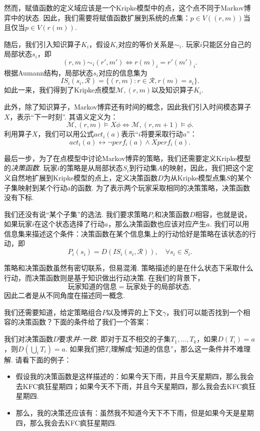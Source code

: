 然而，赋值函数的定义域应该是一个Kripke模型中的点，这个点不同于Markov博弈中的状态. 因此，我们需要将赋值函数扩展到系统的点集：$p \in V((r, m))$当且仅当$p\in V(r(m))$. 

随后，我们引入知识算子$K_i$，假设$K_i$对应的等价关系是$\sim_i$. 玩家$i$只能区分自己的局部状态$s_i$，即
\[(r, m) \sim_i (r', m')\iff r(m)_i = r'(m')_i.\]
根据Aumann结构，局部状态$s_i$对应的信息集为
\[
IS_i(s_i, \mathcal{R}) = \{(r, m): r \in \mathcal{R}, r(m) = s_i\}.
\]
如此一来，我们得到了Kripke点模型$\mathcal{M}, (r, m)$以及知识算子$K_i$.

此外，除了知识算子，Markov博弈还有时间的概念，因此我们引入时间模态算子$X$，表示“下一时刻”. 其语义定义为：
\[
\mathcal{M}, (r, m) \vDash X\phi \iff \mathcal{M}, (r, m+1) \vDash \phi.
\]
利用算子$X$，我们可以用公式$act_i(a)$表示“$i$将要采取行动$a$”：
\[act_i(a) \leftrightarrow \neg perf_i(a) \wedge X perf_i(a).\]

最后一步，为了在点模型中讨论Markov博弈的策略，我们还需要定义Kripke模型的\textit{决策函数}. 玩家$i$的策略是从局部状态$S_i$到行动集$A$的映射，因此，我们把这个定义自然地扩展到Kripke模型的点上，定义决策函数$D$为从Kripke模型点集$S$的某个子集映射到某个行动$a$的函数. 为了表示两个玩家采取相同的决策策略，决策函数没有下标. 

我们还没有说“某个子集”的选法. 我们要求策略$P_i$和决策函数$D$相容，也就是说，如果玩家$i$在这个状态选择了行动$a$，那么决策函数也应该对应产生$a$. 我们可以用信息集来描述这个条件：决策函数在某个信息集上的行动恰好是策略在该状态的行动，即
\[
P_i(s_i) = D(IS_i(s_i, \mathcal{R})), \quad \forall s_i \in S_i.
\]

策略和决策函数虽然有密切联系，但易混淆. 策略描述的是在什么状态下采取什么行动，而决策函数则是基于知识做出行动决策. 在我们的背景下，
    \[\text{玩家知道的信息}=\text{玩家处于的局部状态},\]
因此二者是从不同角度在描述同一概念. 

我们还需要知道，给定策略组合$P$以及博弈的上下文$\gamma$，我们可以能否找到一个相容的决策函数？下面的条件给了我们一个答案：

我们对决策函数$D$要求\textit{并-一致}. 即对于互不相交的子集$T_1, \dots, T_k$，如果$D(T_i) = a$，则$D(\bigcup_i T_i) = a$. 如果我们把$T_i$理解成“知道的信息”，那么这一条件并不难理解. 请看下面的例子：
\begin{itemize}
    \item 假设我的决策函数是这样描述的：如果今天下雨，并且今天星期四，那么我会去KFC疯狂星期四；如果今天不下雨，并且今天星期四，那么我会去KFC疯狂星期四.
    \item 那么，我的决策还应该有：虽然我不知道今天下不下雨，但是如果今天是星期四，那么我会去KFC疯狂星期四.
\end{itemize}

